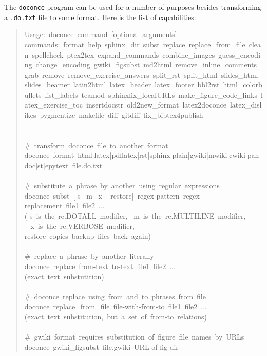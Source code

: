 \documentclass[a4paper]{article}
\begin{document}
The \texttt{doconce} program can be used for a number of purposes besides
transforming a \texttt{.do.txt} file to some format. Here is the
list of capabilities:
%
\begin{quote}{\ttfamily \raggedright \noindent
Usage:~doconce~command~{[}optional~arguments{]}\\
commands:~format~help~sphinx\_dir~subst~replace~replace\_from\_file~clean~spellcheck~ptex2tex~expand\_commands~combine\_images~guess\_encoding~change\_encoding~gwiki\_figsubst~md2html~remove\_inline\_comments~grab~remove~remove\_exercise\_answers~split\_rst~split\_html~slides\_html~slides\_beamer~latin2html~latex\_header~latex\_footer~bbl2rst~html\_colorbullets~list\_labels~teamod~sphinxfix\_localURLs~make\_figure\_code\_links~latex\_exercise\_toc~insertdocstr~old2new\_format~latex2doconce~latex\_dislikes~pygmentize~makefile~diff~gitdiff~fix\_bibtex4publish\\
~\\
~\\
\#~transform~doconce~file~to~another~format\\
doconce~format~html|latex|pdflatex|rst|sphinx|plain|gwiki|mwiki|cwiki|pandoc|st|epytext~file.do.txt\\
~\\
\#~substitute~a~phrase~by~another~using~regular~expressions\\
doconce~subst~{[}-s~-m~-x~-{}-restore{]}~regex-pattern~regex-replacement~file1~file2~...\\
(-s~is~the~re.DOTALL~modifier,~-m~is~the~re.MULTILINE~modifier,\\
~-x~is~the~re.VERBOSE~modifier,~-{}-restore~copies~backup~files~back~again)\\
~\\
\#~replace~a~phrase~by~another~literally\\
doconce~replace~from-text~to-text~file1~file2~...\\
(exact~text~substutition)\\
~\\
\#~doconce~replace~using~from~and~to~phrases~from~file\\
doconce~replace\_from\_file~file-with-from-to~file1~file2~...\\
(exact~text~substitution,~but~a~set~of~from-to~relations)\\
~\\
\#~gwiki~format~requires~substitution~of~figure~file~names~by~URLs\\
doconce~gwiki\_figsubst~file.gwiki~URL-of-fig-dir\\
}
\end{quote}
\end{document}

